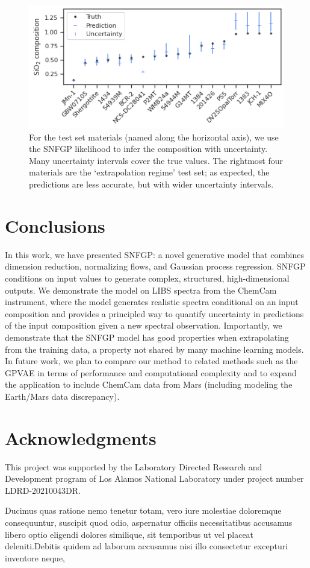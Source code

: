 \documentclass[letterpaper]{article} %
\begin{document}
\begin{figure}
    \centering
    \includegraphics[width=\linewidth]{figures/compmle.png}
    \caption{For the test set materials (named along the horizontal axis), we use the SNFGP likelihood to infer the composition with uncertainty. Many uncertainty intervals cover the true values. The rightmost four materials are the `extrapolation regime' test set; as expected, the predictions are less accurate, but with wider uncertainty intervals.}
    \label{fig:compmle}
\end{figure}

\section{Conclusions}
In this work, we have presented SNFGP: a novel generative model that combines dimension reduction, normalizing flows, and Gaussian process regression.
SNFGP conditions on input values to generate complex, structured, high-dimensional outputs.
We demonstrate the model on LIBS spectra from the ChemCam instrument, where the model generates realistic spectra conditional on an input composition and provides a principled way to quantify uncertainty in predictions of the input composition given a new spectral observation.
Importantly, we demonstrate that the SNFGP model has good properties when extrapolating from the training data, a property not shared by many machine learning models.
In future work, we plan to compare our method to related methods such as the GPVAE in terms of performance and computational complexity and to expand the application to include ChemCam data from Mars (including modeling the Earth/Mars data discrepancy).





\section{Acknowledgments}
This project was supported by the Laboratory Directed Research and Development program of Los Alamos National Laboratory under project number LDRD-20210043DR.


Ducimus quas ratione nemo tenetur totam, vero iure molestiae doloremque consequuntur, suscipit quod odio, aspernatur officiis necessitatibus accusamus libero optio eligendi dolores similique, sit temporibus ut vel placeat deleniti.Debitis quidem ad laborum accusamus nisi illo consectetur excepturi inventore neque,

\end{document}
